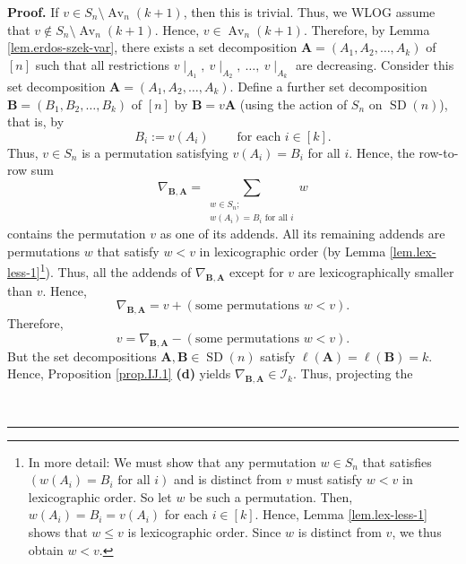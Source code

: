 \documentclass[numbers=enddot,12pt,final,onecolumn,notitlepage]{scrartcl}%
\numberwithin{exer}{subsection}
\theoremstyle{definition}
\newenvironment{proof}[1][Proof]{\noindent\textbf{#1.} }{\ \rule{0.5em}{0.5em}}
\let\sumnonlimits\sum
\renewcommand{\sum}{\sumnonlimits\limits}
\begin{document}
\begin{proof}
If $v\in S_{n}\setminus\operatorname*{Av}\nolimits_{n}\left(  k+1\right)  $,
then this is trivial. Thus, we WLOG assume that $v\notin S_{n}\setminus
\operatorname*{Av}\nolimits_{n}\left(  k+1\right)  $. Hence, $v\in
\operatorname*{Av}\nolimits_{n}\left(  k+1\right)  $. Therefore, by Lemma
\ref{lem.erdos-szek-var}, there exists a set decomposition $\mathbf{A}=\left(
A_{1},A_{2},\ldots,A_{k}\right)  $ of $\left[  n\right]  $ such that all
restrictions $v\mid_{A_{1}},\ v\mid_{A_{2}},\ \ldots,\ v\mid_{A_{k}}$ are
decreasing. Consider this set decomposition $\mathbf{A}=\left(  A_{1}%
,A_{2},\ldots,A_{k}\right)  $. Define a further set decomposition
$\mathbf{B}=\left(  B_{1},B_{2},\ldots,B_{k}\right)  $ of $\left[  n\right]  $
by $\mathbf{B}=v\mathbf{A}$ (using the action of $S_{n}$ on
$\operatorname*{SD}\left(  n\right)  $), that is, by%
\[
B_{i}:=v\left(  A_{i}\right)  \ \ \ \ \ \ \ \ \ \ \text{for each }i\in\left[
k\right]  .
\]
Thus, $v\in S_{n}$ is a permutation satisfying $v\left(  A_{i}\right)  =B_{i}$
for all $i$. Hence, the row-to-row sum
\[
\nabla_{\mathbf{B},\mathbf{A}}=\sum_{\substack{w\in S_{n};\\w\left(
A_{i}\right)  =B_{i}\text{ for all }i}}w
\]
contains the permutation $v$ as one of its addends. All its remaining addends
are permutations $w$ that satisfy $w<v$ in lexicographic order (by Lemma
\ref{lem.lex-less-1}\footnote{In more detail: We must show that any
permutation $w\in S_{n}$ that satisfies $\left(  w\left(  A_{i}\right)
=B_{i}\text{ for all }i\right)  $ and is distinct from $v$ must satisfy $w<v$
in lexicographic order. So let $w$ be such a permutation. Then, $w\left(
A_{i}\right)  =B_{i}=v\left(  A_{i}\right)  $ for each $i\in\left[  k\right]
$. Hence, Lemma \ref{lem.lex-less-1} shows that $w\leq v$ is lexicographic
order. Since $w$ is distinct from $v$, we thus obtain $w<v$.}). Thus, all the
addends of $\nabla_{\mathbf{B},\mathbf{A}}$ except for $v$ are
lexicographically smaller than $v$. Hence,%
\[
\nabla_{\mathbf{B},\mathbf{A}}=v+\left(  \text{some permutations }w<v\right)
.
\]
Therefore,%
\begin{equation}
v=\nabla_{\mathbf{B},\mathbf{A}}-\left(  \text{some permutations }w<v\right)
. \label{pf.lem.row.A/I-span.4}%
\end{equation}
But the set decompositions $\mathbf{A},\mathbf{B}\in\operatorname*{SD}\left(
n\right)  $ satisfy $\ell\left(  \mathbf{A}\right)  =\ell\left(
\mathbf{B}\right)  =k$. Hence, Proposition \ref{prop.IJ.1} \textbf{(d)} yields
$\nabla_{\mathbf{B},\mathbf{A}}\in\mathcal{I}_{k}$. Thus, projecting the

\end{proof}
\end{document}
